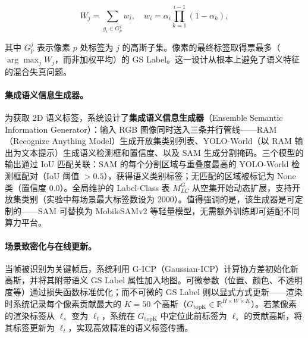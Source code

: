 \begin{equation*}
W_j = \sum_{g_i \in G_p^j} w_i, \quad w_i = \alpha_i \prod_{k=1}^{i-1}(1 - \alpha_k),
\end{equation*}

其中 $G_p^j$ 表示像素 $p$ 处标签为 $j$ 的高斯子集。像素的最终标签取得票最多（$\arg\max_j W_j$，而非加权平均）的 GS Label。这一设计从根本上避免了语义特征的混合失真问题。

\paragraph{集成语义信息生成器。}
为获取 2D 语义标签，系统设计了\textbf{集成语义信息生成器}（Ensemble Semantic Information Generator）：输入 RGB 图像同时送入三条并行管线——RAM（Recognize Anything Model）生成开放集类别列表、YOLO-World（以 RAM 输出为文本提示）生成语义检测框和置信度、以及 SAM 生成分割掩码。三个模型的输出通过 IoU 匹配关联：SAM 的每个分割区域与重叠度最高的 YOLO-World 检测框配对（IoU 阈值 $> 0.5$），获得语义类别标签；无匹配的区域被标记为 None 类（置信度 0.0）。全局维护的 Label-Class 表 $M_{LC}^G$ 从空集开始动态扩展，支持开放集类别（实验中每场景最大标签数设为 2000）。值得强调的是，该生成器是可定制的——SAM 可替换为 MobileSAMv2 等轻量模型，无需额外训练即可适配不同算力平台。

\paragraph{场景致密化与在线更新。}
当帧被识别为关键帧后，系统利用 G-ICP（Gaussian-ICP）计算协方差初始化新高斯，并将其附带语义 GS Label 属性加入地图。可微参数（位置、颜色、不透明度等）通过损失函数标准优化；而不可微的 GS Label 则以显式方式更新——渲染时系统记录每个像素贡献最大的 $K = 50$ 个高斯（$G_{\mathrm{topK}} \in \mathbb{R}^{H \times W \times K}$）。若某像素的渲染标签从 $\ell_s$ 变为 $\ell_t$，系统在 $G_{\mathrm{topK}}$ 中定位此前标签为 $\ell_s$ 的贡献高斯，将其标签更新为 $\ell_t$，实现高效精准的语义标签传播。

